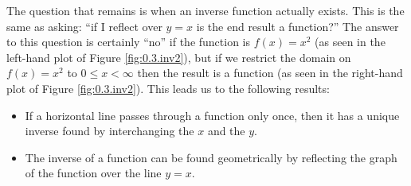 The question that remains is when an inverse function actually exists.  This is the same
as asking: ``if I reflect over $y=x$ is the end result a function?''  The answer to this
question is certainly ``no'' if the function is $f(x) = x^2$ (as seen in the left-hand plot
of Figure \ref{fig:0.3.inv2}), but if we restrict the domain on $f(x) = x^2$ to $0 \le x < \infty$ then
the result is a function (as seen in the right-hand plot of Figure \ref{fig:0.3.inv2}).
This leads us to the following results:
\begin{itemize}
    \item If a horizontal line passes through a function only once, then it has a unique
        inverse found by interchanging the $x$ and the $y$.
    \item The inverse of a function can be found geometrically by reflecting the graph of
        the function over the line $y=x$.
\end{itemize}
